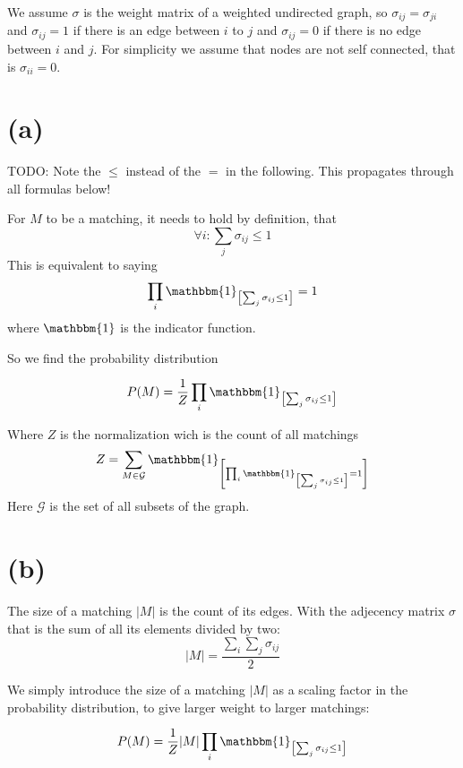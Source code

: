 \documentclass[a4paper]{scrartcl}
\begin{document}
We assume $\sigma$ is the weight matrix of a weighted undirected graph, so $\sigma_{ij} = \sigma_{ji}$ and $\sigma_{ij} = 1$ if there is an edge between $i$ to $j$ and $\sigma_{ij} = 0$ if there is no edge between $i$ and $j$.
For simplicity we assume that nodes are not self connected, that is $\sigma_{ii} = 0$.

\section*{(a)}

{
\color{green}
TODO: Note the $\leq$ instead of the $=$ in the following. This propagates through all formulas below!
}

For $M$ to be a matching, it needs to hold by definition, that $$\forall i:  \sum_j \sigma_{ij} \leq 1$$ 
This is equivalent to saying $$ \prod_i \mathbbm{1}_{\left[\sum_j \sigma_{ij} \leq 1\right]} = 1 $$
where $\mathbbm{1}$ is the indicator function.

So we find the probability distribution

\begin{align}
    P(M) = \frac{1}{Z}\prod_i \mathbbm{1}_{\left[\sum_j \sigma_{ij} \leq 1\right]}
\end{align}

Where $Z$ is the normalization wich is the count of all matchings 
\begin{align}
    Z = \sum_{M \in \mathcal{G}} \mathbbm{1}_{\left[ \prod_i \mathbbm{1}_{\left[\sum_j \sigma_{ij} \leq 1\right]} = 1 \right]} 
\end{align}
Here $\mathcal{G}$ is the set of all subsets of the graph.

\section*{(b)}

The size of a matching $\lvert M \rvert$ is the count of its edges. With the adjecency matrix $\sigma$ that is the sum of all its elements divided by two: $$ \lvert M \rvert = \frac{\sum_{i} \sum_{j} \sigma_{ij}}{2}$$

We simply introduce the size of a matching $\lvert M \rvert$ as a scaling factor in the probability distribution, to give larger weight to larger matchings:

\begin{align}
    P(M) = \frac{1}{Z} \lvert M \rvert \prod_i \mathbbm{1}_{\left[\sum_j \sigma_{ij} \leq 1\right]}
\end{align}
\end{document}
